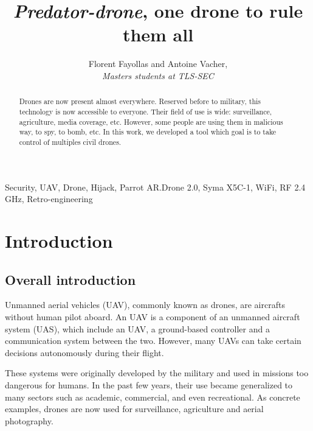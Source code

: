 \documentclass[conference,a4paper]{IEEEtran}
\begin{document}
\title{%
  \textit{Predator-drone}, one drone to rule them all%
}
\author{%
  Florent Fayollas and Antoine Vacher,\\%
  \textit{Masters students at TLS-SEC}%
}
\maketitle


\begin{abstract}
  Drones are now present almost everywhere. Reserved before to military, this technology
  is now accessible to everyone. Their field of use is wide: surveillance, agriculture,
  media coverage, etc. However, some people are using them in malicious way, to spy,
  to bomb, etc. In this work, we developed a tool which goal is to take control of
  multiples civil drones.
\end{abstract}
\vspace*{1.5em}

\begin{IEEEkeywords}
  Security, UAV, Drone, Hijack, Parrot AR.Drone 2.0, Syma X5C-1, WiFi, RF 2.4 GHz, Retro-engineering
\end{IEEEkeywords}
\vspace*{1.5em}



\section{Introduction}
\subsection{Overall introduction}
Unmanned aerial vehicles (UAV), commonly known as drones, are aircrafts without human
pilot aboard. An UAV is a component of an unmanned aircraft system (UAS), which include an
UAV, a ground-based controller and a communication system between the two. However, many
UAVs can take certain decisions autonomously during their flight.

These systems were originally developed by the military and used in missions too dangerous for
humans. In the past few years, their use became generalized to many sectors such as
academic, commercial, and even recreational. As concrete examples, drones are now used for
surveillance, agriculture and aerial photography.
\end{document}
